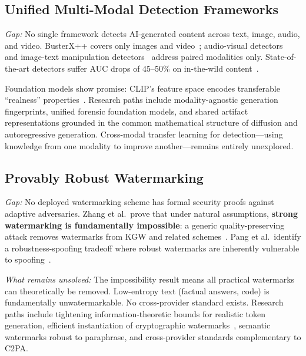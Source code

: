 \subsection{Unified Multi-Modal Detection Frameworks}
\label{sec:future-detection}

\emph{Gap:} No single framework detects AI-generated content across text, image, audio, and video. BusterX++ covers only images and video~\cite{wen2025busterx}; audio-visual detectors~\cite{oorloff2024avff} and image-text manipulation detectors~\cite{shao2023dgm4} address paired modalities only. State-of-the-art detectors suffer AUC drops of 45--50\% on in-the-wild content~\cite{chandra2025deepfakeeval}.

Foundation models show promise: CLIP's feature space encodes transferable ``realness'' properties~\cite{ojha2023univfd}. Research paths include modality-agnostic generation fingerprints, unified forensic foundation models, and shared artifact representations grounded in the common mathematical structure of diffusion and autoregressive generation. Cross-modal transfer learning for detection---using knowledge from one modality to improve another---remains entirely unexplored.


\subsection{Provably Robust Watermarking}
\label{sec:future-watermark}

\emph{Gap:} No deployed watermarking scheme has formal security proofs against adaptive adversaries. Zhang et al.\ prove that under natural assumptions, \textbf{strong watermarking is fundamentally impossible}: a generic quality-preserving attack removes watermarks from KGW and related schemes~\cite{zhang2024impossibility}. Pang et al.\ identify a robustness-spoofing tradeoff where robust watermarks are inherently vulnerable to spoofing~\cite{pang2024nofree}.

\emph{What remains unsolved:} The impossibility result means all practical watermarks can theoretically be removed. Low-entropy text (factual answers, code) is fundamentally unwatermarkable. No cross-provider standard exists. Research paths include tightening information-theoretic bounds for realistic token generation, efficient instantiation of cryptographic watermarks~\cite{christ2024undetectable}, semantic watermarks robust to paraphrase, and cross-provider standards complementary to C2PA.


